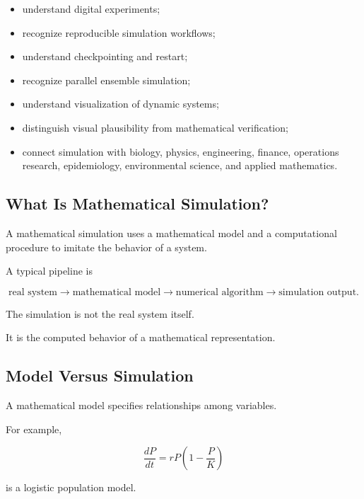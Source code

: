 {\begin{itemize}
    \item understand digital experiments;
    \item recognize reproducible simulation workflows;
    \item understand checkpointing and restart;
    \item recognize parallel ensemble simulation;
    \item understand visualization of dynamic systems;
    \item distinguish visual plausibility from mathematical verification;
    \item connect simulation with biology, physics, engineering, finance,
          operations research, epidemiology, environmental science, and
          applied mathematics.
\end{itemize}
}

\subsection{What Is Mathematical Simulation?}
\label{subsec:what-is-mathematical-simulation}

A mathematical simulation uses a mathematical model and a computational
procedure to imitate the behavior of a system.

A typical pipeline is

\[
\boxed{
\text{real system}
\longrightarrow
\text{mathematical model}
\longrightarrow
\text{numerical algorithm}
\longrightarrow
\text{simulation output}.
}
\]

The simulation is not the real system itself.

It is the computed behavior of a mathematical representation.

\subsection{Model Versus Simulation}
\label{subsec:model-versus-simulation}

A mathematical model specifies relationships among variables.

For example,

\[
\boxed{
\frac{dP}{dt}
=
rP
\left(
1-\frac{P}{K}
\right)
}
\]

is a logistic population model.

